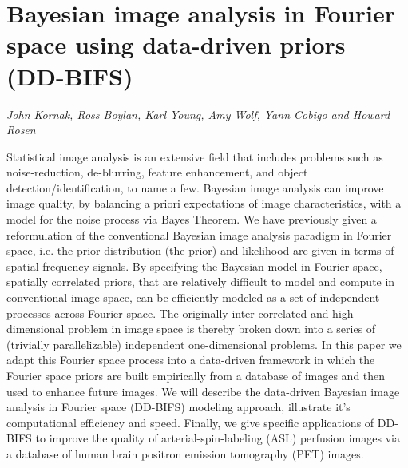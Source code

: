 \documentclass[../booklet.tex]{subfiles}
\begin{document}
\section[Bayesian image analysis in Fourier space using data-driven priors (DD-BIFS). {\it John Kornak, Ross Boylan, Karl Young, Amy Wolf, Yann Cobigo and Howard Rosen}]{Bayesian image analysis in Fourier space using data-driven priors (DD-BIFS)}
     

\begin{center}
  {\it John Kornak, Ross Boylan, Karl Young, Amy Wolf, Yann Cobigo and Howard Rosen}
\end{center}

\vskip 0.8cm


Statistical image analysis is an extensive field that includes problems such as noise-reduction, de-blurring, feature enhancement, and object detection/identification, to name a few. Bayesian image analysis can improve image quality, by balancing a priori expectations of image characteristics, with a model for the noise process via Bayes Theorem. We have previously given a reformulation of the conventional Bayesian image analysis paradigm in Fourier space, i.e. the prior distribution (the prior) and likelihood are given in terms of spatial frequency signals. By specifying the Bayesian model in Fourier space, spatially correlated priors, that are relatively difficult to model and compute in conventional image space, can be efficiently modeled as a set of independent processes across Fourier space. The originally inter-correlated and high-dimensional problem in image space is thereby broken down into a series of (trivially parallelizable) independent one-dimensional problems. In this paper we adapt this Fourier space process into a data-driven framework in which the Fourier space priors are built empirically from a database of images and then used to enhance future images. We will describe the data-driven Bayesian image analysis in Fourier space (DD-BIFS) modeling approach, illustrate it's computational efficiency and speed. Finally, we give specific applications of DD-BIFS to improve the quality of arterial-spin-labeling (ASL) perfusion images via a database of human brain positron emission tomography (PET) images.

\end{document}
